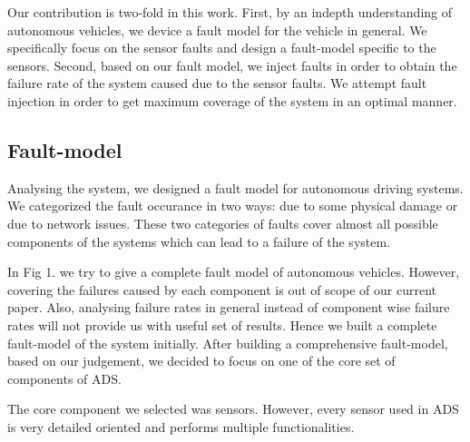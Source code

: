 

Our contribution is two-fold in this work. First, by an indepth understanding of autonomous vehicles, we device a fault model for the vehicle in general. We specifically focus on the sensor faults and design a fault-model specific to the sensors. Second, based on our fault model, we inject faults in order to obtain the failure rate of the system caused due to the sensor faults. We attempt fault injection in order to get maximum coverage of the system in an optimal manner.

\subsection{Fault-model}
Analysing the system, we designed a fault model for autonomous driving systems. We categorized the fault occurance in two ways: due to some physical damage or due to network issues. These two categories of faults cover almost all possible components of the systems which can lead to a failure of the system. 

In Fig 1. we try to give a complete fault model of autonomous vehicles. However, covering the failures caused by each component is out of scope of our current paper. Also, analysing failure rates in general instead of component wise failure rates will not provide us with useful set of results. Hence we built a complete fault-model of the system initially. After building a comprehensive fault-model, based on our judgement, we decided to focus on one of the core set of components of ADS.

 The core component we selected was sensors. However, every sensor used in ADS is very detailed oriented and performs multiple functionalities. 

